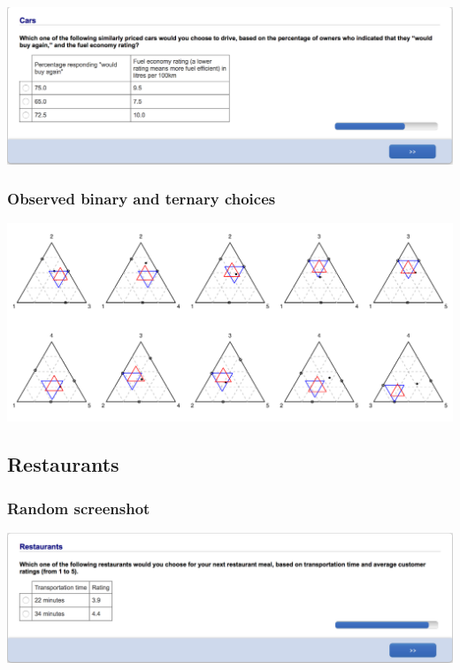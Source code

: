 \documentclass[11pt,letter]{article}
\begin{document}
\includegraphics[width=15cm]{Population_study_design/screenshot_Cars.png}

\subsubsection*{Observed binary and ternary choices}

\includegraphics[width=15cm]{./Population_study_data/Simplexes/Cars.pdf}

\pagebreak

\subsection*{Restaurants}



\subsubsection*{Random screenshot}

\includegraphics[width=15cm]{Population_study_design/screenshot_Restaurants.png}
\end{document}

